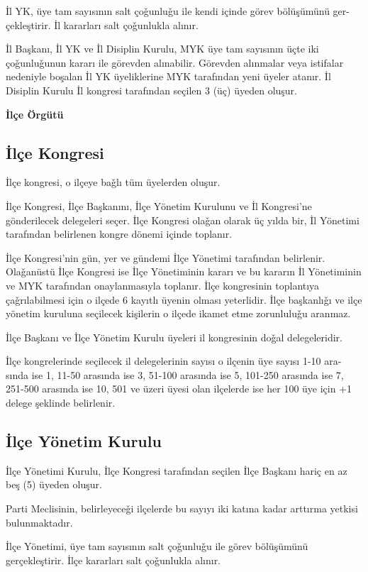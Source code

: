 \documentclass[11pt]{article} %
\begin{document}
İl YK, üye tam sayısının salt çoǧunluǧu ile kendi içinde görev bölüşümünü ger-
çekleştirir. İl kararları salt çoǧunlukla alınır.

İl Başkanı, İl YK ve İl Disiplin Kurulu, MYK üye tam sayısının üçte iki çoǧunluǧunun kararı ile görevden alınabilir. Görevden alınmalar veya istifalar nedeniyle boşalan İl YK üyeliklerine MYK tarafından yeni üyeler atanır. İl Disiplin Kurulu İl kongresi tarafından seçilen 3 (üç) üyeden oluşur.

\hfill \break
\textbf{\Large İlçe Örgütü}

\subsection{İlçe Kongresi}
İlçe kongresi, o ilçeye baǧlı tüm üyelerden oluşur.

İlçe Kongresi, İlçe Başkanını, İlçe Yönetim Kurulunu ve İl Kongresi’ne gönderilecek delegeleri seçer. İlçe Kongresi olaǧan olarak üç yılda bir, İl Yönetimi tarafından belirlenen kongre dönemi içinde toplanır.

İlçe Kongresi’nin gün, yer ve gündemi İlçe Yönetimi tarafından belirlenir. Olaǧanüstü İlçe Kongresi ise İlçe Yönetiminin kararı ve bu kararın İl Yönetiminin ve MYK tarafından onaylanmasıyla toplanır. İlçe kongresinin toplantıya çaǧrılabilmesi için o ilçede 6 kayıtlı üyenin olması yeterlidir. İlçe başkanlıǧı ve ilçe yönetim kuruluna seçilecek kişilerin o ilçede ikamet etme zorunluluǧu aranmaz.

İlçe Başkanı ve İlçe Yönetim Kurulu üyeleri il kongresinin doǧal delegeleridir.

İlçe kongrelerinde seçilecek il delegelerinin sayısı o ilçenin üye sayısı 1-10 ara-
sında ise 1, 11-50 arasında ise 3, 51-100 arasında ise 5, 101-250 arasında ise 7,
251-500 arasında ise 10, 501 ve üzeri üyesi olan ilçelerde ise her 100 üye için +1
delege şeklinde belirlenir.

\subsection{İlçe Yönetim Kurulu}
İlçe Yönetimi Kurulu, İlçe Kongresi tarafından seçilen İlçe Başkanı hariç en az beş (5) üyeden oluşur.

Parti Meclisinin, belirleyeceǧi ilçelerde bu sayıyı iki katına kadar arttırma yetkisi
bulunmaktadır.

İlçe Yönetimi, üye tam sayısının salt çoǧunluǧu ile görev bölüşümünü gerçekleştirir. İlçe kararları salt çoǧunlukla alınır.
\end{document}

